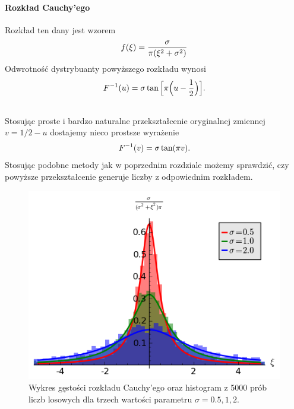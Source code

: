 \documentclass[a4paper,12pt,polish]{sphinxmanual}
\begin{document}
\paragraph{Rozkład Cauchy'ego}
\label{ch5/chV011:rozklad-cauchy-ego}
Rozkład ten dany jest wzorem
\begin{gather}
\begin{split}f(\xi) = \frac{\sigma}{\pi (\xi^2 + \sigma^2)}\end{split}\notag
\end{gather}
Odwrotność dystrybuanty powyższego rozkładu wynosi
\begin{gather}
\begin{split}F^{-1}(u) = \sigma \tan \Big[\pi \Big(u - \frac{1}{2} \Big)\Big].\end{split}\notag\\\begin{split}\end{split}\notag
\end{gather}
Stosując proste i bardzo naturalne przekształcenie oryginalnej zmiennej $v = 1/2 - u$
dostajemy nieco prostsze wyrażenie
\begin{gather}
\begin{split}F^{-1}(v) = \sigma \tan (\pi v).\end{split}\notag
\end{gather}
Stosując podobne metody jak w poprzednim rozdziale możemy sprawdzić, czy powyższe przekształcenie
generuje liczby z odpowiednim rozkładem.
\begin{figure}[htbp]
\centering
\capstart

\includegraphics{r_cauchy_hist.png}
\caption{Wykres gęstości rozkładu Cauchy'ego oraz histogram z 5000 prób liczb losowych dla trzech wartości parametru
$\sigma = 0.5, 1, 2$.}\end{figure}
\end{document}
